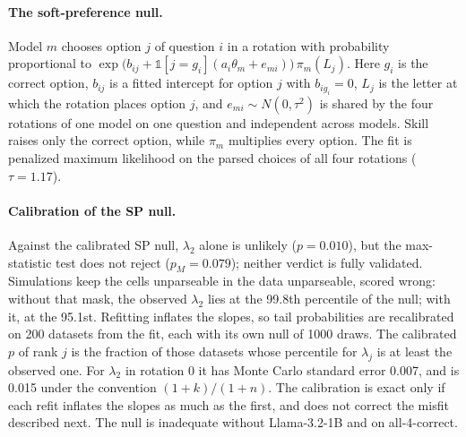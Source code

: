 \documentclass{article}
\theoremstyle{plain}
\theoremstyle{remark}
\begin{document}
\paragraph{The soft-preference null.} Model $m$ chooses option $j$ of
question $i$ in a rotation with probability proportional to
$\exp\!\big(b_{ij}+\mathbb{1}[j=g_i](a_i\theta_m+e_{mi})\big)\,\pi_m(L_j)$.
Here $g_i$ is the correct option, $b_{ij}$ is a fitted intercept for
option $j$ with $b_{i g_i}=0$, $L_j$ is the letter at which the rotation
places option $j$, and $e_{mi}\sim N(0,\tau^2)$ is shared by the four
rotations of one model on one question and independent across models.
Skill raises only the correct option, while $\pi_m$ multiplies every option.
The fit is penalized maximum likelihood on the parsed choices of all four
rotations ($\tau=1.17$).

\paragraph{Calibration of the SP null.} Against the calibrated SP null,
$\lambda_2$ alone is unlikely ($p=0.010$), but the max-statistic test
does not reject ($p_M=0.079$); neither verdict is fully validated.
Simulations keep the cells unparseable in the data unparseable, scored
wrong: without that mask, the observed
$\lambda_2$ lies at the 99.8th percentile of the null; with it, at the
95.1st. Refitting inflates the slopes, so tail probabilities are recalibrated on 200 datasets from the fit, each with its own null
of 1000 draws. The calibrated $p$ of rank $j$ is the fraction of those
datasets whose percentile for $\lambda_j$ is at least the observed one.
For $\lambda_2$ in rotation 0 it has Monte Carlo standard error 0.007,
and is 0.015 under the convention $(1+k)/(1+n)$. The calibration is exact only if
each refit inflates the slopes as much as the first, and does not correct the misfit described next. The null is inadequate without
Llama-3.2-1B and on all-4-correct.
\end{document}
